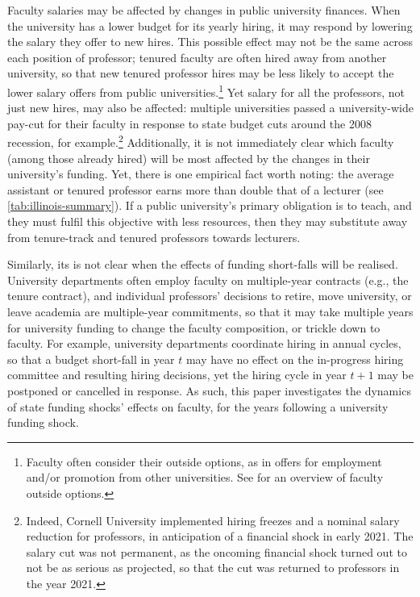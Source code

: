 Faculty salaries may be affected by changes in public university finances.
When the university has a lower budget for its yearly hiring, it may respond by lowering the salary they offer to new hires.
This possible effect may not be the same across each position of professor; tenured faculty are often hired away from another university, so that new tenured professor hires may be less likely to accept the lower salary offers from public universities.\footnote{
    Faculty often consider their outside options, as in offers for employment and/or promotion from other universities.
    See \cite{blackaby2005} for an overview of faculty outside options.
}
Yet salary for all the professors, not just new hires, may also be affected: multiple universities passed a university-wide pay-cut for their faculty in response to state budget cuts around the 2008 recession, for example.\footnote{
    Indeed, Cornell University implemented hiring freezes and a nominal salary reduction for professors, in anticipation of a financial shock in early 2021.
    The salary cut was not permanent, as the oncoming financial shock turned out to not be as serious as projected, so that the cut was returned to professors in the year 2021.
}
Additionally, it is not immediately clear which faculty (among those already hired) will be most affected by the changes in their university's funding.
Yet, there is one empirical fact worth noting: the average assistant or tenured professor earns more than double that of a lecturer (see \autoref{tab:illinois-summary}).
If a public university's primary obligation is to teach, and they must fulfil this objective with less resources, then they may substitute away from tenure-track and tenured professors towards lecturers.

Similarly, its is not clear when the effects of funding short-falls will be realised.
University departments often employ faculty on multiple-year contracts (e.g., the tenure contract), and individual professors' decisions to retire, move university, or leave academia are multiple-year commitments, so that it may take multiple years for university funding to change the faculty composition, or trickle down to faculty.
For example, university departments coordinate hiring in annual cycles, so that a budget short-fall in year $t$ may have no effect on the in-progress hiring committee and resulting hiring decisions, yet the hiring cycle in year $t+1$ may be postponed or cancelled in response.
As such, this paper investigates the dynamics of state funding shocks' effects on faculty, for the years following a university funding shock.
